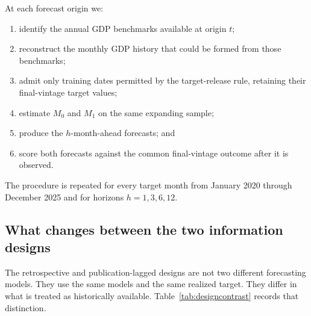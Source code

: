 \documentclass[preprint,12pt,authoryear]{elsarticle}
\begin{document}
At each forecast origin we:
\begin{enumerate}
\item identify the annual GDP benchmarks available at origin $t$;
\item reconstruct the monthly GDP history that could be formed from those benchmarks;
\item admit only training dates permitted by the target-release rule, retaining their final-vintage target values;
\item estimate $M_0$ and $M_1$ on the same expanding sample;
\item produce the $h$-month-ahead forecasts; and
\item score both forecasts against the common final-vintage outcome after it is observed.
\end{enumerate}
The procedure is repeated for every target month from January 2020 through December 2025 and for horizons $h=1,3,6,12$.

\subsection{What changes between the two information designs}

The retrospective and publication-lagged designs are not two different forecasting models. They use the same models and the same realized target. They differ in what is treated as historically available. Table~\ref{tab:designcontrast} records that distinction.
\end{document}
